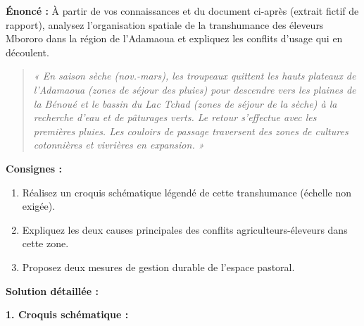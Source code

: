\documentclass[11pt]{article}
\begin{document}
\begin{exoresolu}
\textbf{Énoncé :} À partir de vos connaissances et du document ci-après (extrait fictif de rapport), analysez l'organisation spatiale de la transhumance des éleveurs Mbororo dans la région de l'Adamaoua et expliquez les conflits d'usage qui en découlent.
\begin{quote}
\textit{« En saison sèche (nov.-mars), les troupeaux quittent les hauts plateaux de l'Adamaoua (zones de séjour des pluies) pour descendre vers les plaines de la Bénoué et le bassin du Lac Tchad (zones de séjour de la sèche) à la recherche d'eau et de pâturages verts. Le retour s'effectue avec les premières pluies. Les couloirs de passage traversent des zones de cultures cotonnières et vivrières en expansion. »}
\end{quote}
\textbf{Consignes :}
\begin{enumerate}
    \item Réalisez un croquis schématique légendé de cette transhumance (échelle non exigée).
    \item Expliquez les deux causes principales des conflits agriculteurs-éleveurs dans cette zone.
    \item Proposez deux mesures de gestion durable de l'espace pastoral.
\end{enumerate}
\tcblower
\textbf{Solution détaillée :}

\textbf{1. Croquis schématique :}
\begin{popfigure}
\end{popfigure}
\end{exoresolu}
\end{document}
